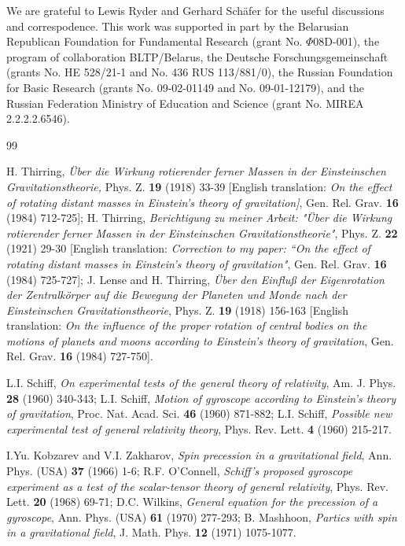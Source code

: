 \documentclass[preprint,showpacs,preprintnumbers,amsmath,amssymb]{revtex4}
\begin{document}
We are grateful to Lewis Ryder and Gerhard Sch\"afer for the
useful discussions and correspodence.
This work was supported in part by the Belarusian Republican
Foundation for Fundamental Research (grant No. $\Phi$08D-001),
the program of collaboration BLTP/Belarus, the Deutsche
Forschungsgemeinschaft (grants No. HE 528/21-1 and No. 436 RUS
113/881/0), the Russian Foundation for Basic Research (grants No.
09-02-01149 and No. 09-01-12179), and the Russian Federation
Ministry of Education and Science (grant No. MIREA 2.2.2.2.6546).

\begin{thebibliography}{99}

H. Thirring,
{\it \"Uber die Wirkung rotierender ferner Massen in der
Einsteinschen Gravitationstheorie,} Phys. Z. %
{\bf 19} (1918) 33-39 [English translation: {\it On the effect of 
rotating distant masses in Einstein's theory of gravitation]},
Gen. Rel. Grav. {\bf 16} (1984) 712-725]; H. Thirring, {\it Berichtigung 
zu meiner Arbeit: "\"Uber die Wirkung rotierender ferner Massen in der 
Einsteinschen Gravitationstheorie"}, Phys. Z. {\bf 22} (1921) 29-30 
[English translation: {\it Correction to my paper: ``On the effect of 
rotating distant masses in Einstein's theory of gravitation"}, 
Gen. Rel. Grav. {\bf 16} (1984) 725-727];
J. Lense and H. Thirring,
{\it \"Uber den Einflu{\ss} der Eigenrotation der
Zentralk\"orper auf die Bewegung der Planeten und Monde nach der
Einsteinschen Gravitationstheorie}, Phys. Z. {\bf 19} (1918) 156-163
[English translation: {\it On the influence of the proper rotation
of central bodies on the motions of planets and moons according to 
Einstein's theory of gravitation}, Gen. Rel. Grav. {\bf 16} (1984)
727-750].

L.I. Schiff,
{\it On experimental tests of the general theory of relativity},
{Am. J. Phys.} \textbf{28} (1960) 340-343; L.I. Schiff, 
{\it Motion of gyroscope according to Einstein's theory of gravitation},
{Proc. Nat. Acad. Sci.} \textbf{46} (1960) 871-882; L.I. Schiff,
{\it Possible new experimental test of general relativity theory}, 
{Phys. Rev. Lett.} \textbf{4} (1960) 215-217.

I.Yu. Kobzarev and V.I. Zakharov,
{\it Spin precession in a gravitational field},
Ann. Phys. (USA) {\bf 37} (1966) 1-6;
R.F. O'Connell,
{\it Schiff's proposed gyroscope experiment as a test of the
scalar-tensor theory of general relativity},
Phys. Rev. Lett. {\bf 20} (1968) 69-71;
D.C. Wilkins,
{\it General equation for the precession of a gyroscope},
Ann. Phys. (USA) {\bf 61} (1970) 277-293;
B. Mashhoon,
{\it Partics with spin in a gravitational field},
J. Math. Phys. {\bf 12} (1971) 1075-1077.


\end{thebibliography}
\end{document}
